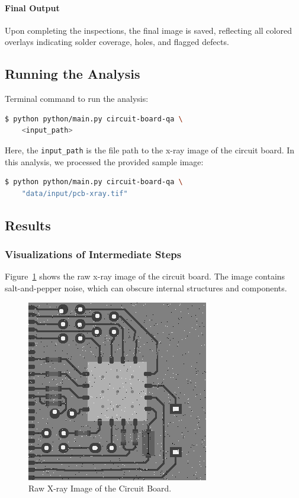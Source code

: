 \documentclass[a4paper,12pt]{article}
\begin{document}
\paragraph{Final Output}

Upon completing the inspections, the final image is saved, reflecting all colored overlays indicating solder coverage, holes, and flagged defects.

\subsection{Running the Analysis}

Terminal command to run the analysis:

\begin{lstlisting}[language=bash]
$ python python/main.py circuit-board-qa \
    <input_path>
\end{lstlisting}

Here, the \texttt{input\_path} is the file path to the x-ray image of the circuit board. In this analysis, we processed the provided sample image:

\begin{lstlisting}[language=bash]
$ python python/main.py circuit-board-qa \
    "data/input/pcb-xray.tif"
\end{lstlisting}

\subsection{Results}

\subsubsection{Visualizations of Intermediate Steps}

Figure~\ref{fig:image_raw} shows the raw x-ray image of the circuit board. The image contains salt-and-pepper noise, which can obscure internal structures and components.

\begin{figure}[!htbp]
    \centering
    \includegraphics[width=0.5\linewidth]{data/output/circuit_board_qa/image_raw.png}
    \caption{Raw X-ray Image of the Circuit Board.}
    \label{fig:image_raw}
\end{figure}
\end{document}
